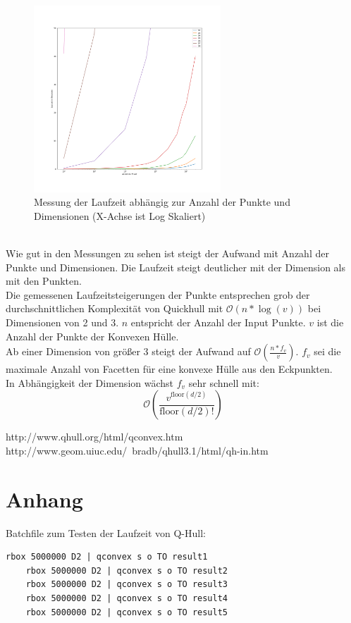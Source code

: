 \documentclass[conference]{IEEEtran}
\begin{document}
	\begin{figure}[h!]
		\begin{center}
			\includegraphics[width=7cm]{Laufzeitlog.png}
			\caption{Messung der Laufzeit abhängig zur Anzahl der Punkte und Dimensionen (X-Achse ist Log Skaliert)}
			\label{figure_2}
		\end{center}
	\end{figure}\\
	Wie gut in den Messungen zu sehen ist steigt der Aufwand mit Anzahl der Punkte und Dimensionen. Die Laufzeit steigt deutlicher mit der Dimension als mit den Punkten.\\
	Die gemessenen Laufzeitsteigerungen der Punkte entsprechen grob der durchschnittlichen Komplexität von Quickhull mit $\mathcal{O}(n * \log(v))$ bei Dimensionen von 2 und 3. $n$ entspricht der Anzahl der Input Punkte. $v$ ist die Anzahl der Punkte der Konvexen Hülle.\\
	Ab einer Dimension von größer 3 steigt der Aufwand auf $\mathcal{O}(\frac{n*f_v}{v})$. $f_v$ sei die maximale Anzahl von Facetten für eine konvexe Hülle aus den Eckpunkten.\\
	In Abhängigkeit der Dimension wächst $f_v$ sehr schnell mit: \[\mathcal{O}(\frac{v^{\text{floor}(d/2)}}{\text{floor}(d/2)!})\]
	\cite{b3}
	
	\begin{thebibliography}{00}
		 http://www.qhull.org/html/qconvex.htm
		 http://www.geom.uiuc.edu/~bradb/qhull3.1/html/qh-in.htm
	\end{thebibliography}
	
	
	
	\section{Anhang}

	Batchfile zum Testen der Laufzeit von Q-Hull:
	\begin{lstlisting}[basicstyle=\tiny]
	rbox 5000000 D2 | qconvex s o TO result1
	rbox 5000000 D2 | qconvex s o TO result2
	rbox 5000000 D2 | qconvex s o TO result3
	rbox 5000000 D2 | qconvex s o TO result4
	rbox 5000000 D2 | qconvex s o TO result5
	\end{lstlisting}	
\end{document}
